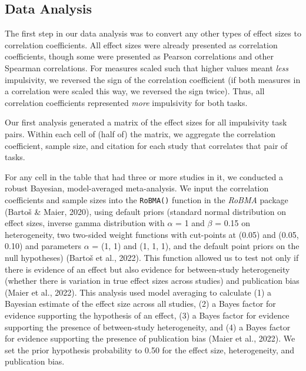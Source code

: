 \documentclass[
  ,pub,floatsintext]{apa6}
\begin{document}
\hypertarget{data-analysis}{%
\subsection{Data Analysis}\label{data-analysis}}

The first step in our data analysis was to convert any other types of effect sizes to correlation coefficients. All effect sizes were already presented as correlation coefficients, though some were presented as Pearson correlations and other Spearman correlations. For measures scaled such that higher values meant \emph{less} impulsivity, we reversed the sign of the correlation coefficient (if both measures in a correlation were scaled this way, we reversed the sign twice). Thus, all correlation coefficients represented \emph{more} impulsivity for both tasks.

Our first analysis generated a matrix of the effect sizes for all impulsivity task pairs. Within each cell of (half of) the matrix, we aggregate the correlation coefficient, sample size, and citation for each study that correlates that pair of tasks.

For any cell in the table that had three or more studies in it, we conducted a robust Bayesian, model-averaged meta-analysis. We input the correlation coefficients and sample sizes into the \texttt{RoBMA()} function in the \emph{RoBMA} package (Bartoš \& Maier, 2020), using default priors (standard normal distribution on effect sizes, inverse gamma distribution with \(\alpha\) = 1 and \(\beta\) = 0.15 on heterogeneity, two two-sided weight functions with cut-points at (0.05) and (0.05, 0.10) and parameters \(\alpha\) = (1, 1) and (1, 1, 1), and the default point priors on the null hypotheses) (Bartoš et al., 2022). This function allowed us to test not only if there is evidence of an effect but also evidence for between-study heterogeneity (whether there is variation in true effect sizes across studies) and publication bias (Maier et al., 2022). This analysis used model averaging to calculate (1) a Bayesian estimate of the effect size across all studies, (2) a Bayes factor for evidence supporting the hypothesis of an effect, (3) a Bayes factor for evidence supporting the presence of between-study heterogeneity, and (4) a Bayes factor for evidence supporting the presence of publication bias (Maier et al., 2022). We set the prior hypothesis probability to 0.50 for the effect size, heterogeneity, and publication bias.
\end{document}
